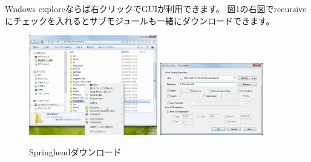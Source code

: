 \medskip
Wndows exploreならば右クリックでGUIが利用できます。
図1の右図でrecursiveにチェックを入れるとサブモジュールも一緒にダウンロードできます。
\begin{narrow}[15pt]
	\begin{figure}[h]
	\begin{center}
	\includegraphics[width=0.5\textwidth]{fig/SpringheadClone1.eps}
	\includegraphics[width=0.4\textwidth]{fig/SpringheadClone2.eps}
	\end{center}
	\caption{Springheadダウンロード}
	\label{fig:SpringheadClone}
	\end{figure}
\end{narrow}

